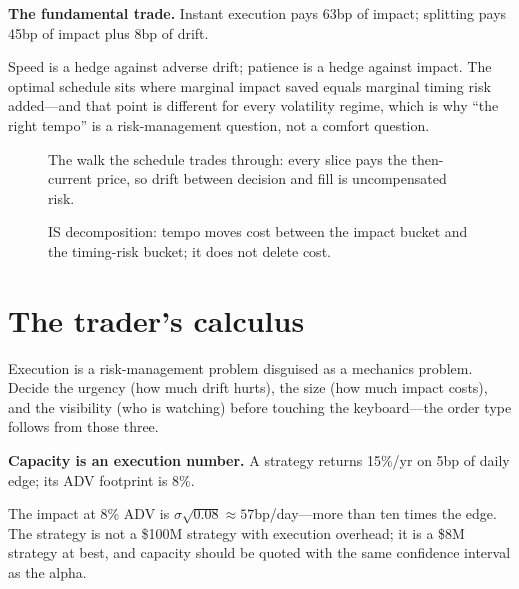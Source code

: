 \begin{example}\label{ex:tradeoff}
\textbf{The fundamental trade.} Instant execution pays 63bp of impact; splitting pays
45bp of impact plus 8bp of drift.
\begin{solution}
Speed is a hedge against adverse drift; patience is a hedge against impact. The optimal
schedule sits where marginal impact saved equals marginal timing risk added---and that
point is different for every volatility regime, which is why ``the right tempo'' is a
risk-management question, not a comfort question.
\end{solution}
\end{example}

\begin{figure}[htbp]\centering

\caption{The walk the schedule trades through: every slice pays the then-current price,
so drift between decision and fill is uncompensated risk.}
\label{fig:path10}
\end{figure}

\begin{figure}[htbp]\centering

\caption{IS decomposition: tempo moves cost between the impact bucket and the timing-risk
bucket; it does not delete cost.}
\label{fig:is}
\end{figure}

\section{The trader's calculus}\label{sec:trader}

Execution is a risk-management problem disguised as a mechanics problem. Decide the
urgency (how much drift hurts), the size (how much impact costs), and the visibility (who
is watching) before touching the keyboard---the order type follows from those three.

\begin{example}\label{ex:capacity}
\textbf{Capacity is an execution number.} A strategy returns 15\%/yr on 5bp of daily edge;
its ADV footprint is 8\%.
\begin{solution}
The impact at 8\% ADV is $\sigma\sqrt{0.08}\approx57$bp/day---more than ten times the edge.
The strategy is not a \$100M strategy with execution overhead; it is a \$8M strategy at
best, and capacity should be quoted with the same confidence interval as the alpha.
\end{solution}
\end{example}

